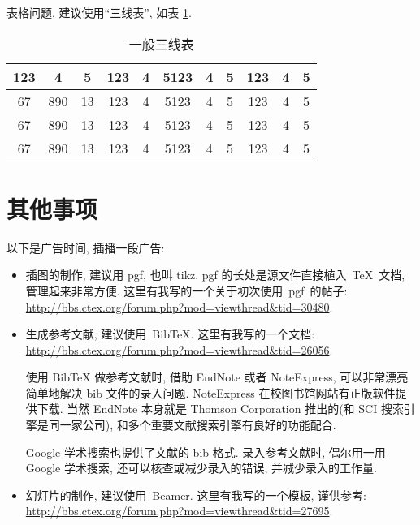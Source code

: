 \documentclass{NJUPTThesis}%
\begin{document}
表格问题, 建议使用``三线表'', 如表 \ref{tab:1}.

\begin{table}[ht]
\centering
\caption{一般三线表}
\label{tab:1}
    \begin{tabular}{c c c c c c c c c c c}
    \hline
    123 & 4  & 5  & 123 & 4 & 5123 & 4 & 5 & 123 & 4 & 5\\
    \hline
    67 & 890 & 13 & 123 & 4 & 5123 & 4 & 5 & 123 & 4 & 5\\
    67 & 890 & 13 & 123 & 4 & 5123 & 4 & 5 & 123 & 4 & 5\\
    67 & 890 & 13 & 123 & 4 & 5123 & 4 & 5 & 123 & 4 & 5\\
    \hline
    \end{tabular}
\end{table}







\section{其他事项}
以下是广告时间, 插播一段广告:
\begin{itemize}
    \item 插图的制作, 建议用 pgf, 也叫 tikz.
          pgf 的长处是源文件直接植入~\TeX~文档, 管理起来非常方便.
    这里有我写的一个关于初次使用~pgf~的帖子:\\    \url{http://bbs.ctex.org/forum.php?mod=viewthread&tid=30480}.
    \item 生成参考文献, 建议使用~BibTeX. 这里有我写的一个文档: \\
    \url{http://bbs.ctex.org/forum.php?mod=viewthread&tid=26056}.

          {\kaishu 使用 BibTeX{} 做参考文献时,
      借助 EndNote 或者 NoteExpress, 可以非常漂亮简单地解决 bib 文件的录入问题.
      NoteExpress 在校图书馆网站有正版软件提供下载.
      当然 EndNote 本身就是 Thomson Corporation 推出的(和 SCI 搜索引擎是同一家公司),
      和多个重要文献搜索引擎有良好的功能配合.

      Google 学术搜索也提供了文献的 bib 格式.
      录入参考文献时, 偶尔用一用 Google 学术搜索, 还可以核查或减少录入的错误, 并减少录入的工作量.}

    \item 幻灯片的制作, 建议使用~Beamer. 这里有我写的一个模板, 谨供参考:\\
    \url{http://bbs.ctex.org/forum.php?mod=viewthread&tid=27695}.
\end{itemize}
\end{document}
